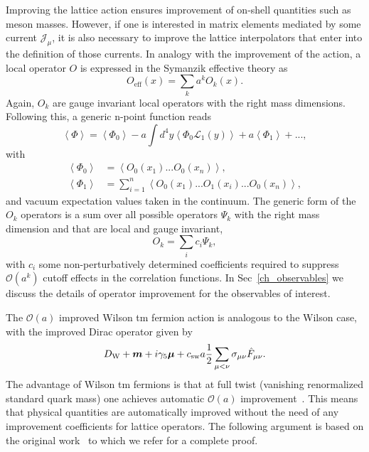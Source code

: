 Improving the lattice action ensures improvement of on-shell quantities such as meson masses. However, if one is interested in matrix elements mediated by some current $\mathcal{J}_{\mu}$, it is also necessary to improve the lattice interpolators that enter into the definition of those currents. In analogy with the improvement of the action, a local operator $O$ is expressed in the Symanzik effective theory as
\begin{equation}
O_{\textrm{eff}}(x)=\sum_ka^kO_k(x).
\end{equation}
Again, $O_k$ are gauge invariant local operators with the right mass dimensions. Following this, a generic n-point function reads
\begin{equation}
\label{ch_foundation:eq:Oimpr}
\left<\Phi\right>=\left<\Phi_0\right>-a\int d^4y\left<\Phi_0\mathcal{L}_1(y)\right>+a\left<\Phi_1\right>+...,
\end{equation}
with 
\begin{align}
\left<\Phi_0\right>&=\left<O_0(x_1)...O_0(x_n)\right>, \\
\left<\Phi_1\right>&=\sum_{i=1}^n\left<O_0(x_1)...O_1(x_i)...O_0(x_n)\right>,
\end{align}
and vacuum expectation values taken in the continuum. The generic form of the $O_k$ operators is a sum over all possible operators $\Psi_k$ with the right mass dimension and that are local and gauge invariant,
\begin{equation}
O_k=\sum_ic_i\Psi_k,
\end{equation}
with $c_i$ some non-perturbatively determined coefficients required to suppress $\mathcal{O}(a^k)$ cutoff effects in the correlation functions. In Sec~\ref{ch_observables} we discuss the details of operator improvement for the observables of interest.

The $\mathcal{O}(a)$ improved Wilson tm fermion action is analogous to the Wilson case, with the improved Dirac operator given by 
\begin{equation}
D_{\textrm W}+\boldsymbol{m}+i\gamma_5\boldsymbol{\mu}+c_{\textrm{sw}}a\frac{1}{2}\sum_{\mu<\nu}\sigma_{\mu\nu}\hat{F}_{\mu\nu}.
\end{equation}
The advantage of Wilson tm fermions is that at full twist (vanishing renormalized standard quark mass) one achieves automatic $\mathcal{O}(a)$ improvement~\citep{Frezzotti:2003ni,Shindler:2007vp}. This means that physical quantities are automatically improved without the need of any improvement coefficients for lattice operators. The following argument is based on the original work~\citep{Frezzotti:2003ni} to which we refer for a complete proof.

